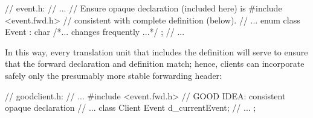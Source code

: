 \begin{emcppslisting}[emcppsbatch=e7]
// event.h:
// ...                  // Ensure opaque declaration (included here) is
#include <event.fwd.h>  // consistent with complete definition (below).
// ...
enum class Event : char { /*... changes frequently ...*/ };
// ...
\end{emcppslisting}

\noindent In this way, every translation unit that includes the definition will
serve to ensure that the forward declaration and definition match;
hence, clients can incorporate safely only the presumably more stable
forwarding header:

\begin{emcppslisting}[emcppsbatch=e7]
// goodclient.h:
// ...
#include <event.fwd.h>  // GOOD IDEA: consistent opaque declaration
// ...
class Client
{
    Event d_currentEvent;
    // ...
};
\end{emcppslisting}


